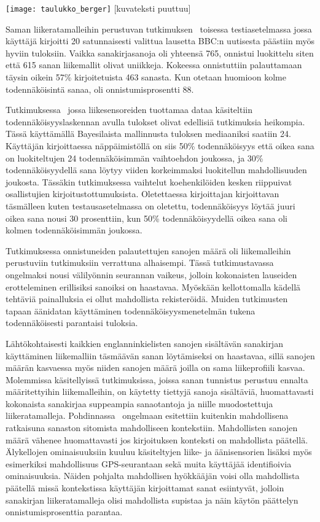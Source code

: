 \documentclass[finnish]{tktltiki2}
\theoremstyle{definition}
\theoremstyle{remark}
\begin{document}
\texttt{[image: taulukko\_berger]}
[kuvateksti puuttuu]


Saman liikeratamalleihin perustuvan tutkimuksen~\cite{liu} toisessa testiasetelmassa jossa käyttäjä kirjoitti 20 satunnaisesti valittua lausetta BBC:n uutisesta päästiin myös hyviin tuloksiin. Vaikka sanakirjasanoja oli yhteensä 765, onnistui luokittelu siten että 615 sanan liikemallit olivat uniikkeja. Kokeessa onnistuttiin palauttamaan täysin oikein 57\% kirjoitetuista 463 sanasta. Kun otetaan huomioon kolme todennäköisintä sanaa, oli onnistumisprosentti 88.

Tutkimuksessa~\cite{mole} jossa liikesensoreiden tuottamaa dataa käsiteltiin todennäköisyyslaskennan avulla tulokset olivat edellisiä tutkimuksia heikompia. Tässä käyttämällä Bayesilaista mallinnusta tuloksen mediaaniksi saatiin 24. Käyttäjän kirjoittaessa näppäimistöllä on siis 50\% todennäköisyys että oikea sana on luokiteltujen 24 todennäköisimmän vaihtoehdon joukossa, ja 30\% todennäköisyydellä sana löytyy viiden korkeimmaksi luokitellun mahdollisuuden joukosta. Tässäkin tutkimuksessa vaihtelut koehenkilöiden kesken riippuivat osallistujien kirjoitustottumuksista. Oletettaessa kirjoittajan kirjoittavan täsmälleen kuten testausasetelmassa on oletettu, todennäköisyys löytää juuri oikea sana nousi 30 prosenttiin, kun 50\% todennäköisyydellä oikea sana oli kolmen todennäköisimmän joukossa.

Tutkimuksessa onnistuneiden palautettujen sanojen määrä oli liikemalleihin perustuviin tutkimuksiin verrattuna alhaisempi. Tässä tutkimustavassa ongelmaksi nousi välilyönnin seurannan vaikeus, jolloin kokonaisten lauseiden erotteleminen erillisiksi sanoiksi on haastavaa. Myöskään kellottomalla kädellä tehtäviä painalluksia ei ollut mahdollista rekisteröidä. Muiden tutkimusten tapaan äänidatan käyttäminen todennäköisyysmenetelmän tukena todennäköisesti parantaisi tuloksia.

Lähtökohtaisesti kaikkien englanninkielisten sanojen sisältävän sanakirjan käyttäminen liikemalliin täsmäävän sanan löytämiseksi on haastavaa, sillä sanojen määrän kasvaessa myös niiden sanojen määrä joilla on sama liikeprofiili kasvaa. Molemmissa käsitellyissä tutkimuksissa, joissa sanan tunnistus perustuu ennalta määritettyihin liikemalleihin, on käytetty tiettyjä sanoja sisältäviä, huomattavasti kokonaista sanakirjaa suppeampia sanaotantoja ja niille muodostettuja liikeratamalleja. Pohdinnassa~\cite{liu} ongelmaan esitettiin kuitenkin mahdollisena ratkaisuna sanaston sitomista mahdolliseen kontekstiin. Mahdollisten sanojen määrä vähenee huomattavasti jos kirjoituksen konteksti on mahdollista päätellä. Älykellojen ominaisuuksiin kuuluu käsiteltyjen liike- ja äänisensorien lisäksi myös esimerkiksi mahdollisuus GPS-seurantaan sekä muita käyttäjää identifioivia ominaisuuksia. Näiden pohjalta mahdollisen hyökkääjän voisi olla mahdollista päätellä missä kontekstissa käyttäjän kirjoittamat sanat esiintyvät, jolloin sanakirjan liikeratamalleja olisi mahdollista supistaa ja näin käytön päättelyn onnistumisprosenttia parantaa. 
\end{document}
